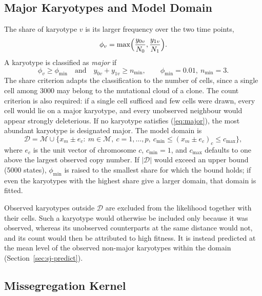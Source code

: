 \documentclass[11pt]{article}
\begin{document}
\subsection{Major Karyotypes and Model Domain}
\label{sec:sj-domain}

The share of karyotype $v$ is its larger frequency over the two time points,
\begin{equation}
  \phi_v=\max\Bigl(\frac{y_{0v}}{N_0},\frac{y_{1v}}{N_1}\Bigr).
  \label{eq:share}
\end{equation}
A karyotype is classified as \emph{major} if
\begin{equation}
  \phi_v\ge\phi_{\min}\quad\text{and}\quad y_{0v}+y_{1v}\ge n_{\min},
  \qquad \phi_{\min}=0.01,\ n_{\min}=3 .
  \label{eq:major}
\end{equation}
The share criterion adapts the classification to the number of cells, since a
single cell among 3000 may belong to the mutational cloud of a clone.
The count criterion is also required: if a single cell sufficed and few cells
were drawn, every cell would lie on a major karyotype, and every unobserved neighbour
would appear strongly deleterious. If no karyotype satisfies
(\ref{eq:major}), the most abundant karyotype is designated major. The model
domain is
\begin{equation}
  \mathcal{D}=\mathcal{M}\cup\bigl\{x_m\pm e_c:\ m\in\mathcal{M},\
  c=1,\ldots,p,\ c_{\min}\le(x_m\pm e_c)_c\le c_{\max}\bigr\},
  \label{eq:domain}
\end{equation}
where $e_c$ is the unit vector of chromosome $c$, $c_{\min}=1$, and
$c_{\max}$ defaults to one above the largest observed copy number. If
$|\mathcal{D}|$ would exceed an upper bound (5000 states), $\phi_{\min}$ is
raised to the smallest share for which the bound holds; if even the
karyotypes with the highest share give a larger domain, that domain is
fitted.

Observed karyotypes outside $\mathcal{D}$ are excluded from the likelihood
together with their cells. Such a karyotype would otherwise be included only
because it was observed, whereas its unobserved counterparts at the same
distance would not, and its count would then be attributed to high fitness.
It is instead predicted at the mean level of the observed non-major
karyotypes within the domain (Section~\ref{sec:sj-predict}).

\subsection{Missegregation Kernel}
\label{sec:sj-division}
\end{document}
